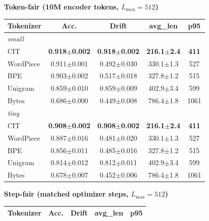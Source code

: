 
\begin{table}[t]
\centering
\small
\setlength{\tabcolsep}{3.5pt}

\begin{minipage}[t]{0.49\textwidth}
\centering
\textbf{Token-fair (10M encoder tokens, $L_{\max}{=}512$)}\par\vspace{0.3em}
\begin{tabular*}{\linewidth}{@{\extracolsep{\fill}}lcccc@{}}
\toprule
Tokenizer & Acc. & Drift & avg\_len & p95 \\
\midrule
\multicolumn{5}{l}{\textit{small}}\\
CIT        & \textbf{0.918$\pm$0.002} & \textbf{0.918$\pm$0.002} & \textbf{216.1$\pm$2.4} & \textbf{411} \\
WordPiece  & 0.911$\pm$0.001 & 0.492$\pm$0.030 & 330.1$\pm$1.3 & 527 \\
BPE        & 0.903$\pm$0.002 & 0.517$\pm$0.018 & 327.8$\pm$1.2 & 515 \\
Unigram    & 0.859$\pm$0.010 & 0.859$\pm$0.009 & 402.9$\pm$3.4 & 599 \\
Bytes      & 0.686$\pm$0.000 & 0.449$\pm$0.008 & 786.4$\pm$1.8 & 1061 \\
\midrule
\multicolumn{5}{l}{\textit{tiny}}\\
CIT        & \textbf{0.908$\pm$0.002} & \textbf{0.908$\pm$0.002} & \textbf{216.1$\pm$2.4} & \textbf{411} \\
WordPiece  & 0.887$\pm$0.016 & 0.481$\pm$0.020 & 330.1$\pm$1.3 & 527 \\
BPE        & 0.856$\pm$0.011 & 0.485$\pm$0.016 & 327.8$\pm$1.2 & 515 \\
Unigram    & 0.814$\pm$0.012 & 0.812$\pm$0.011 & 402.9$\pm$3.4 & 599 \\
Bytes      & 0.678$\pm$0.007 & 0.452$\pm$0.006 & 786.4$\pm$1.8 & 1061 \\
\bottomrule
\end{tabular*}
\end{minipage}\hfill
\begin{minipage}[t]{0.49\textwidth}
\centering
\textbf{Step-fair (matched optimizer steps, $L_{\max}{=}512$)}\par\vspace{0.3em}
\begin{tabular*}{\linewidth}{@{\extracolsep{\fill}}lcccc@{}}
\toprule
Tokenizer & Acc. & Drift & avg\_len & p95 \\
\midrule

\end{tabular*}
\end{minipage}
\end{table}

